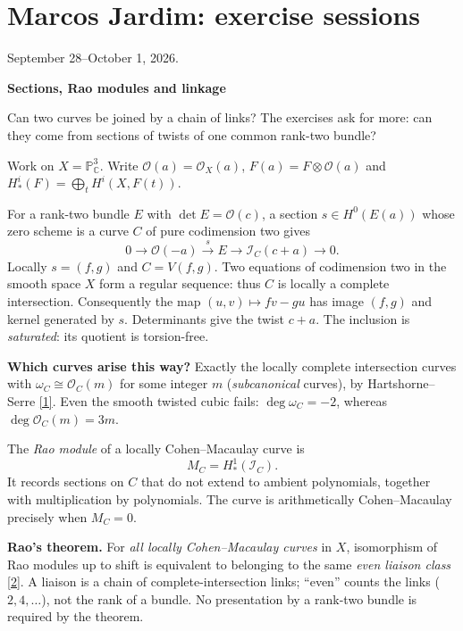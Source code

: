 \section{Marcos Jardim: exercise sessions}
\label{section-jardim-problems}

September 28--October 1, 2026.

\medskip\noindent
{}
\label{paragraph-jardim-sections}
\textbf{Sections, Rao modules and linkage}
\par\nopagebreak\noindent
Can two curves be joined by a chain
of links? The exercises ask for more:
can they come from sections of twists
of one common rank-two bundle?

Work on $X=\mathbb{P}^3_{\mathbb{C}}$.
Write $\mathcal{O}(a)=\mathcal{O}_X(a)$,
$F(a)=F\otimes\mathcal{O}(a)$ and
$H^i_*(F)=\bigoplus_t H^i(X,F(t))$.

For a rank-two bundle $E$ with
$\det E=\mathcal{O}(c)$, a section
$s\in H^0(E(a))$ whose zero scheme is
a curve $C$ of pure codimension two gives
\begin{equation}
0\longrightarrow\mathcal{O}(-a)
\xrightarrow{s}E
\longrightarrow\mathcal{I}_C(c+a)
\longrightarrow0.
\label{equation-jardim-section}
\end{equation}
Locally $s=(f,g)$ and $C=V(f,g)$.
Two equations of codimension two in
the smooth space $X$ form a regular
sequence: thus $C$ is locally a complete
intersection. Consequently the map
$(u,v)\mapsto fv-gu$ has image $(f,g)$
and kernel generated by $s$.
Determinants give the twist $c+a$.
The inclusion is \emph{saturated}:
its quotient is torsion-free.

\textbf{Which curves arise this way?}
Exactly the locally complete intersection
curves with $\omega_C\cong\mathcal{O}_C(m)$
for some integer $m$ (\emph{subcanonical}
curves), by Hartshorne--Serre
\hyperref[item-jardim-serre]{[1]}.
Even the smooth twisted cubic fails:
$\deg\omega_C=-2$, whereas
$\deg\mathcal{O}_C(m)=3m$.

The \emph{Rao module} of a locally
Cohen--Macaulay curve is
$$
M_C=H^1_*(\mathcal{I}_C).
$$
It records sections on $C$ that do not
extend to ambient polynomials, together
with multiplication by polynomials.
The curve is arithmetically
Cohen--Macaulay precisely when $M_C=0$.

\textbf{Rao's theorem.}
For \emph{all locally Cohen--Macaulay
curves} in $X$, isomorphism of Rao modules
up to shift is equivalent to belonging
to the same \emph{even liaison class}
\hyperref[item-jardim-rao]{[2]}.
A liaison is a chain of
complete-intersection links; ``even''
counts the links ($2,4,\ldots$), not
the rank of a bundle.
No presentation by a rank-two bundle
is required by the theorem.

